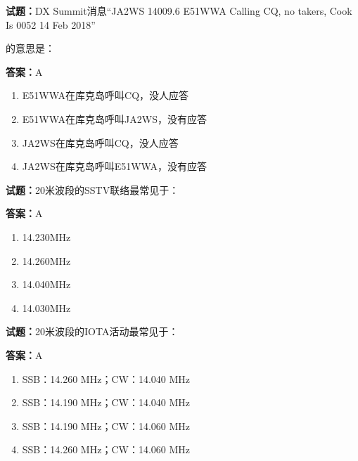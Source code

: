 \documentclass{ctexbook}
\begin{document}
\textbf{试题：}DX Summit消息“JA2WS 14009.6 E51WWA Calling CQ, no takers, Cook Is 0052 14 Feb 2018”


的意思是： 

\textbf{答案：}A 

\begin{enumerate}[leftmargin=3em]
  \item E51WWA在库克岛呼叫CQ，没人应答 

  \item E51WWA在库克岛呼叫JA2WS，没有应答 

  \item JA2WS在库克岛呼叫CQ，没人应答 

  \item JA2WS在库克岛呼叫E51WWA，没有应答 

\end{enumerate}





\vspace{1em}

\textbf{试题：}20米波段的SSTV联络最常见于： 

\textbf{答案：}A 

\begin{enumerate}[leftmargin=3em]
  \item 14.230MHz 

  \item 14.260MHz 

  \item 14.040MHz 

  \item 14.030MHz 

\end{enumerate}





\vspace{1em}

\textbf{试题：}20米波段的IOTA活动最常见于： 

\textbf{答案：}A 

\begin{enumerate}[leftmargin=3em]
  \item SSB：14.260 MHz；CW：14.040 MHz 

  \item SSB：14.190 MHz；CW：14.040 MHz 

  \item SSB：14.190 MHz；CW：14.060 MHz 

  \item SSB：14.260 MHz；CW：14.060 MHz 

\end{enumerate}
\end{document}
